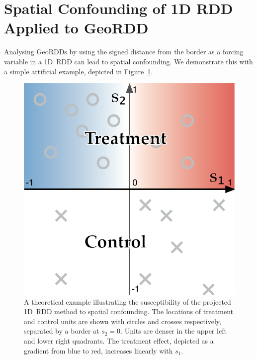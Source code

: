 \documentclass[letter]{article}
\makeatletter
\def\maxwidth{\ifdim\Gin@nat@width>\linewidth\linewidth
\else\Gin@nat@width\fi}
\let\Oldincludegraphics\includegraphics
\renewcommand{\includegraphics}[1]{\Oldincludegraphics[width=0.9\maxwidth]{#1}}
\makeatother
\begin{document}
    	\appendix
    


    	\hypertarget{spatial-confounding-of-1d-rdd-applied-to-geordd}{%
\section{Spatial Confounding of 1D RDD Applied to GeoRDD}\label{spatial-confounding-of-1d-rdd-applied-to-geordd}}
    


    	\label{sec:confounding}
    


    	Analysing GeoRDDs by using the signed distance from the border as a forcing variable in a 1D~RDD can lead to spatial confounding.
We demonstrate this with a simple artificial example, depicted in Figure~\ref{fig:confounding}.
    


    	\begin{figure}
\centering
\includegraphics{figures/confounding/confounding.pdf}
\caption{A theoretical example illustrating the susceptibility of the projected 1D~RDD method to spatial confounding. The locations of treatment and control units are shown with circles and crosses respectively, separated by a border at \(s_2 = 0\). Units are denser in the upper left and lower right quadrants. The treatment effect, depicted as a gradient from blue to red, increases linearly with \(s_1\). \label{fig:confounding}}
\end{figure}
    
\end{document}
